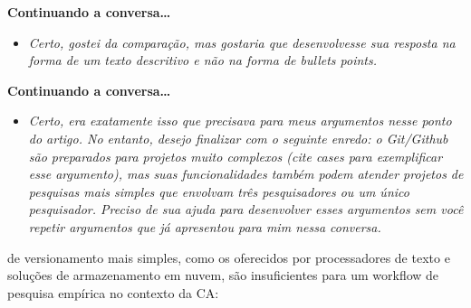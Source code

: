 \documentclass[
  a4paper,
]{book}
\providecommand{\tightlist}{%
  \setlength{\itemsep}{0pt}\setlength{\parskip}{0pt}}\usepackage{longtable,booktabs,array}
\begin{document}
{  \textbf{Continuando a conversa\ldots{}}

  \begin{itemize}
  \tightlist
  \item
    \emph{Certo, gostei da comparação, mas gostaria que desenvolvesse
    sua resposta na forma de um texto descritivo e não na forma de
    bullets points.}
  \end{itemize}

  \textbf{Continuando a conversa\ldots{}}

  \begin{itemize}
  \tightlist
  \item
    \emph{Certo, era exatamente isso que precisava para meus argumentos
    nesse ponto do artigo. No entanto, desejo finalizar com o seguinte
    enredo: o Git/Github são preparados para projetos muito complexos
    (cite cases para exemplificar esse argumento), mas suas
    funcionalidades também podem atender projetos de pesquisas mais
    simples que envolvam três pesquisadores ou um único pesquisador.
    Preciso de sua ajuda para desenvolver esses argumentos sem você
    repetir argumentos que já apresentou para mim nessa conversa.}
  \end{itemize}} de versionamento mais simples, como os oferecidos por
processadores de texto e soluções de armazenamento em nuvem, são
insuficientes para um workflow de pesquisa empírica no contexto da CA:
\end{document}
